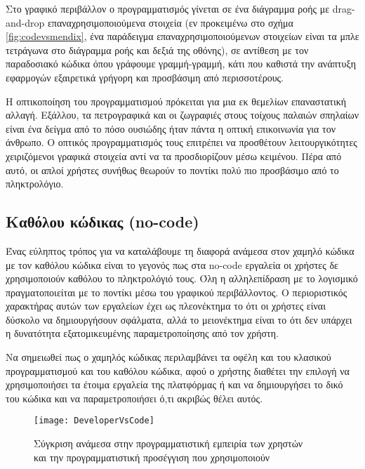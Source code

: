                 Στο γραφικό περιβάλλον ο προγραμματισμός γίνεται σε ένα διάγραμμα ροής με drag-and-drop επαναχρησιμοποιούμενα στοιχεία (εν προκειμένω στο σχήμα \ref{fig:codevsmendix}, ένα παράδειγμα επαναχρησιμοποιούμενων στοιχείων είναι τα μπλε τετράγωνα στο διάγραμμα ροής και δεξιά της οθόνης), σε αντίθεση με τον παραδοσιακό κώδικα όπου γράφουμε γραμμή-γραμμή, κάτι που καθιστά την ανάπτυξη εφαρμογών εξαιρετικά γρήγορη και προσβάσιμη από περισσοτέρους.

                Η οπτικοποίηση του προγραμματισμού πρόκειται για μια εκ θεμελίων επαναστατική αλλαγή. Εξάλλου, τα πετρογραφικά και οι ζωγραφιές στους τοίχους παλαιών σπηλαίων είναι ένα δείγμα από το πόσο ουσιώδης ήταν πάντα η οπτική επικοινωνία για τον άνθρωπο. \cite{CASEKuhn}  Ο οπτικός προγραμματισμός τους επιτρέπει να προσθέτουν λειτουργικότητες χειριζόμενοι γραφικά στοιχεία αντί να τα προσδιορίζουν μέσω κειμένου. Πέρα από αυτό, οι απλοί χρήστες συνήθως θεωρούν το ποντίκι πολύ πιο προσβάσιμο από το πληκτρολόγιο.

            \subsection{Καθόλου κώδικας (no-code)}
                Ένας εύληπτος τρόπος για να καταλάβουμε τη διαφορά ανάμεσα στον χαμηλό κώδικα με τον καθόλου κώδικα είναι το γεγονός πως στα no-code εργαλεία οι χρήστες δε χρησιμοποιούν καθόλου το πληκτρολόγιό τους. Όλη η αλληλεπίδραση με το λογισμικό πραγματοποιείται με το ποντίκι μέσω του γραφικού περιβάλλοντος. Ο περιοριστικός χαρακτήρας αυτών των εργαλείων έχει ως πλεονέκτημα το ότι οι χρήστες είναι δύσκολο να δημιουργήσουν σφάλματα, αλλά το μειονέκτημα είναι το ότι δεν υπάρχει η δυνατότητα εξατομικευμένης παραμετροποίησης από τον χρήστη.

                Να σημειωθεί πως ο χαμηλός κώδικας περιλαμβάνει τα οφέλη και του κλασικού προγραμματισμού και του καθόλου κώδικα, αφού ο χρήστης διαθέτει την επιλογή να χρησιμοποιήσει τα έτοιμα εργαλεία της πλατφόρμας ή και να δημιουργήσει το δικό του κώδικα και να παραμετροποιήσει ό,τι ακριβώς θέλει αυτός.

            \begin{figure}[H] \noindent \centering
                    \texttt{[image: DeveloperVsCode]}
                    \caption{\centering Σύγκριση ανάμεσα στην προγραμματιστική εμπειρία των χρηστών \\ και την προγραμματιστική προσέγγιση που χρησιμοποιούν \cite{LowCodeSimon}}
            \end{figure}

